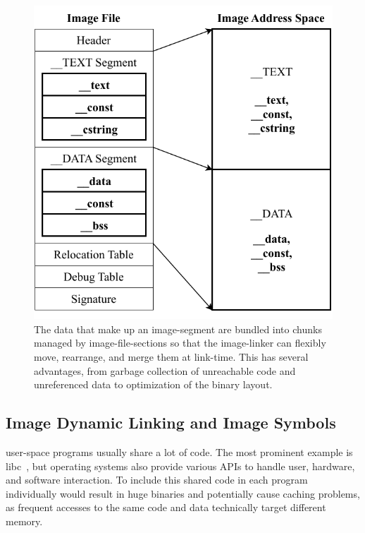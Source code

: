 \begin{figure}[htb]
  \centering
  \includegraphics{Figures/Sections.pdf}
  \caption{Image File Sections.}
  \label{fig:img_secs}
  \caption*{The data that make up an \gls{image-segment} are bundled into chunks managed by \glspl{image-file-section} so that the \gls{image-linker} can flexibly move, rearrange, and merge them at link-time. This has several advantages, from garbage collection of unreachable code and unreferenced data to optimization of the binary layout.}
\end{figure}

\subsection{Image Dynamic Linking and Image Symbols}
\label{sec:dyn_link}

\Gls{user-space} programs usually share a lot of code. The most prominent example is \gls{libc}~\cite{gcc}, but operating systems also provide various \glspl{API} to handle user, hardware, and software interaction. To include this shared code in each program individually would result in huge binaries and potentially cause caching problems, as frequent accesses to the same code and data technically target different memory.

